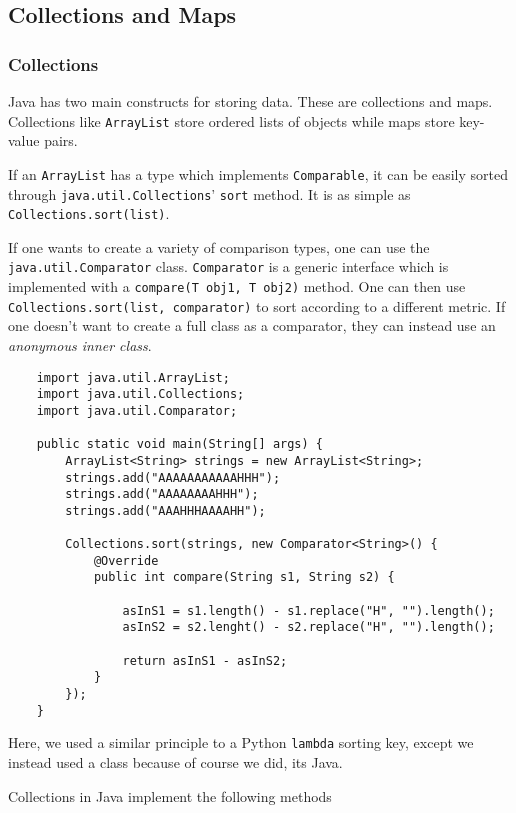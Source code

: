 \documentclass[12pt]{report}
\newcommand{\code}[1]{\lstinline{#1}}
\begin{document}
\begin{flushleft}
\subsection*{Collections and Maps}

\subsubsection*{Collections}

Java has two main constructs for storing data. These are collections and maps.
Collections like \code{ArrayList} store ordered lists of objects while maps
store key-value pairs. \par
If an \code{ArrayList} has a type which implements \code{Comparable}, it can
be easily sorted through \code{java.util.Collections}' \code{sort} method.
It is as simple as \code{Collections.sort(list)}. \par
If one wants to create a variety of comparison types, one can use the
\code{java.util.Comparator} class. \code{Comparator} is a generic interface
which is implemented with a \code{compare(T obj1, T obj2)} method. One can then
use \code{Collections.sort(list, comparator)} to sort according to a different
metric. If one doesn't want to create a full class as a comparator, they can
instead use an \textit{anonymous inner class}.

\begin{lstlisting}
    import java.util.ArrayList;
    import java.util.Collections;
    import java.util.Comparator;
    
    public static void main(String[] args) {
        ArrayList<String> strings = new ArrayList<String>;
        strings.add("AAAAAAAAAAAHHH");
        strings.add("AAAAAAAAHHH");
        strings.add("AAAHHHAAAAHH");

        Collections.sort(strings, new Comparator<String>() {
            @Override
            public int compare(String s1, String s2) {

                asInS1 = s1.length() - s1.replace("H", "").length();
                asInS2 = s2.lenght() - s2.replace("H", "").length();

                return asInS1 - asInS2;
            }
        });
    }
\end{lstlisting}

Here, we used a similar principle to a Python \code{lambda} sorting key, except
we instead used a class because of course we did, its Java.

\bigskip
Collections in Java implement the following methods


\end{flushleft}
\end{document}
